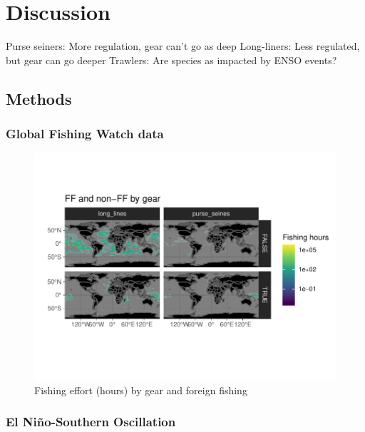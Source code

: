 \documentclass[11pt]{article}
\begin{document}
\section{Discussion}

Purse seiners: More regulation, gear can't go as deep
Long-liners: Less regulated, but gear can go deeper 
Trawlers: Are species as impacted by ENSO events?


\subsection{Methods}

\subsubsection{Global Fishing Watch data}

\begin{figure}
\centering
\includegraphics{img/fishing_raster.pdf}
\caption{Fishing effort (hours) by gear and foreign fishing}
\end{figure}


\subsubsection{El Ni\~{n}o-Southern Oscillation}
\end{document}
